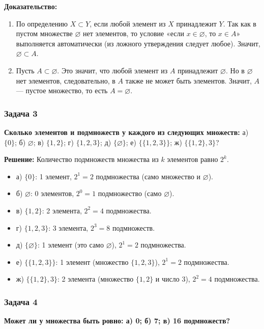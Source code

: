 \documentclass[12pt, a4paper]{article}
\begin{document}
\textbf{Доказательство:}
\begin{enumerate}[label=\alph*)]
    \item По определению \(X \subset Y\), если любой элемент из \(X\) принадлежит \(Y\). Так как в пустом множестве \(\varnothing\) нет элементов, то условие «если \(x \in \varnothing\), то \(x \in A\)» выполняется автоматически (из ложного утверждения следует любое). Значит, \(\varnothing \subset A\).
    \item Пусть \(A \subset \varnothing\). Это значит, что любой элемент из \(A\) принадлежит \(\varnothing\). Но в \(\varnothing\) нет элементов, следовательно, в \(A\) также не может быть элементов. Значит, \(A\) — пустое множество, то есть \(A = \varnothing\).
\end{enumerate}

\subsubsection*{Задача 3}
\textbf{Сколько элементов и подмножеств у каждого из следующих множеств:}
а) \(\{0\}\); б) \(\varnothing\); в) \(\{1, 2\}\); г) \(\{1, 2, 3\}\); д) \(\{\varnothing\}\); е) \(\{\{1, 2, 3\}\}\); ж) \(\{\{1, 2\}, 3\}\)?

\textbf{Решение:}
Количество подмножеств множества из \(k\) элементов равно \(2^k\).
\begin{itemize}
    \item а) \(\{0\}\): 1 элемент, \(2^1 = 2\) подмножества (само множество и \(\varnothing\)).
    \item б) \(\varnothing\): 0 элементов, \(2^0 = 1\) подмножество (само \(\varnothing\)).
    \item в) \(\{1, 2\}\): 2 элемента, \(2^2 = 4\) подмножества.
    \item г) \(\{1, 2, 3\}\): 3 элемента, \(2^3 = 8\) подмножеств.
    \item д) \(\{\varnothing\}\): 1 элемент (это само \(\varnothing\)), \(2^1 = 2\) подмножества.
    \item е) \(\{\{1, 2, 3\}\}\): 1 элемент (множество \(\{1, 2, 3\}\)), \(2^1 = 2\) подмножества.
    \item ж) \(\{\{1, 2\}, 3\}\): 2 элемента (множество \(\{1, 2\}\) и число 3), \(2^2 = 4\) подмножества.
\end{itemize}

\subsubsection*{Задача 4}
\textbf{Может ли у множества быть ровно: а) 0; б) 7; в) 16 подмножеств?}
\end{document}
